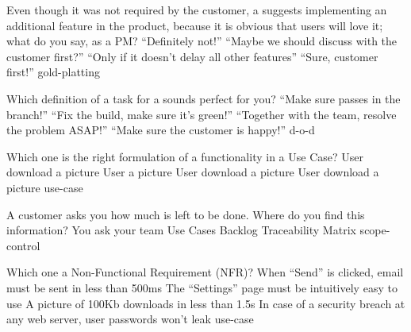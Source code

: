\documentclass{article}
\begin{document}


\pmbaQuestion
  {Even though it was not required by the customer, a  suggests implementing an additional feature in the product, because it is obvious that users will love it; what do you say, as a PM?}
  {``Definitely not!''}
  {``Maybe we should discuss with the customer first?''}
  {``Only if it doesn't delay all other features''}
  {``Sure, customer first!''}
  {gold-platting}

\pmbaQuestion
  {Which definition of a task for a  sounds perfect for you?}
  {``Make sure  passes in the  branch!''}
  {``Fix the build, make sure it's green!''}
  {``Together with the team, resolve the problem ASAP!''}
  {``Make sure the customer is happy!''}
  {d-o-d}

\pmbaQuestion
  {Which one is the right formulation of a functionality in a Use Case?}
  {User  download a picture}
  {User  a picture}
  {User  download a picture}
  {User  download a picture}
  {use-case}

\pmbaQuestion
  {A customer asks you how much  is left to be done. Where do you find this information?}
  {You ask your team}
  {Use Cases}
  {Backlog}
  {Traceability Matrix}
  {scope-control}

\pmbaQuestion
  {Which one  a Non-Functional Requirement (NFR)?}
  {When ``Send'' is clicked, email must be sent in less than 500ms}
  {The ``Settings'' page must be intuitively easy to use}
  {A picture of 100Kb downloads in less than 1.5s}
  {In case of a security breach at any web server, user passwords won't leak}
  {use-case}
\end{document}
